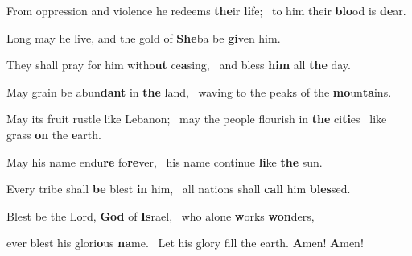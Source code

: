 \item From oppression and violence he redeems \textbf{the}ir \textbf{li}fe;~\mediant
 to him their \textbf{blo}od is \textbf{de}ar.

\item Long may he live, and the gold of \textbf{She}ba be \textbf{gi}ven him.

\item They shall pray for him witho\textbf{ut} ce\textbf{a}sing,~\mediant
 and bless \textbf{him} all \textbf{the} day.

\item May grain be abun\textbf{dant} in \textbf{the} land,~\mediant
 waving to the peaks of the \textbf{mo}un\textbf{ta}ins.

\item May its fruit rustle like Lebanon;~\flex
 may the people flourish in \textbf{the} ci\textbf{ti}es~\mediant
 like grass \textbf{on} the \textbf{e}arth.

\item May his name endu\textbf{re} fo\textbf{re}ver,~\mediant
 his name continue \textbf{li}ke \textbf{the} sun.

\item Every tribe shall \textbf{be} blest \textbf{in} him,~\mediant
 all nations shall \textbf{call} him \textbf{bles}sed.

\item Blest be the Lord, \textbf{God} of \textbf{Is}rael,~\mediant
 who alone \textbf{w}orks \textbf{won}ders,

\item ever blest his glori\textbf{o}us \textbf{na}me.~\mediant
 Let his glory fill the earth. \textbf{A}men! \textbf{A}men!